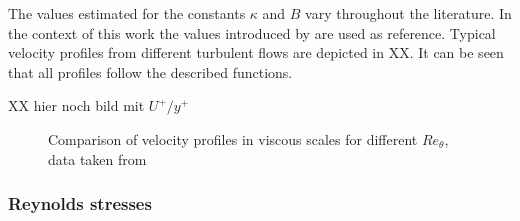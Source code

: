 The values estimated for the constants $\kappa$ and $B$ vary throughout the literature.
In the context of this work the values introduced by \citet{pope_turbulent_2015} are used as reference.
Typical velocity profiles from different turbulent flows are depicted in XX.
It can be seen that all profiles follow the described functions.

XX hier noch bild mit $U^+/y^+$

\begin{figure}[H]
    \centering
    \caption{Comparison of velocity profiles in viscous scales for different $Re_\theta$, data taken from \citet{balasubramanian_direct_2023}}
    \label{fig:Uplus_yplus}
\end{figure}

\subsubsection{Reynolds stresses}


